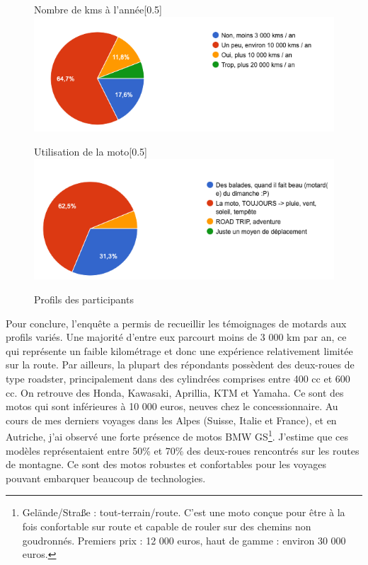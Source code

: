 \begin{figure}[H]
  \begin{subcaptionbox}{Nombre de kms à l'année}[0.5\linewidth]
    {\includegraphics[width=\linewidth]{coeur_memoire/graphique/nb_km_an.png}}
  \end{subcaptionbox}
  \hfill
  \begin{subcaptionbox}{Utilisation de la moto}[0.5\linewidth]
    {\includegraphics[width=\linewidth]{coeur_memoire/graphique/utilisation_moto.png}}
  \end{subcaptionbox}
  \caption{Profils des participants}
\end{figure}
Pour conclure, l’enquête a permis de recueillir les témoignages de motards aux profils variés. Une majorité d’entre eux parcourt moins de 3 000 km par an, ce qui représente un faible kilométrage et donc une expérience relativement limitée sur la route. Par ailleurs, la plupart des répondants possèdent des deux-roues de type roadster, principalement dans des cylindrées comprises entre 400 cc et 600 cc. On retrouve des Honda, Kawasaki, Aprillia, KTM et Yamaha. Ce sont des motos qui sont inférieures à 10 000 euros, neuves chez le concessionnaire.
Au cours de mes derniers voyages dans les Alpes (Suisse, Italie et France), et en Autriche, j’ai observé une forte présence de motos BMW GS\footnote{Gelände/Straße : tout-terrain/route. C'est une moto conçue pour être à la fois confortable sur route et capable de rouler sur des chemins non goudronnés. Premiers prix : 12 000 euros, haut de gamme : environ 30 000 euros.}. J’estime que ces modèles représentaient entre 50\% et 70\% des deux-roues rencontrés sur les routes de montagne. Ce sont des motos robustes et confortables pour les voyages pouvant embarquer beaucoup de technologies. \\
